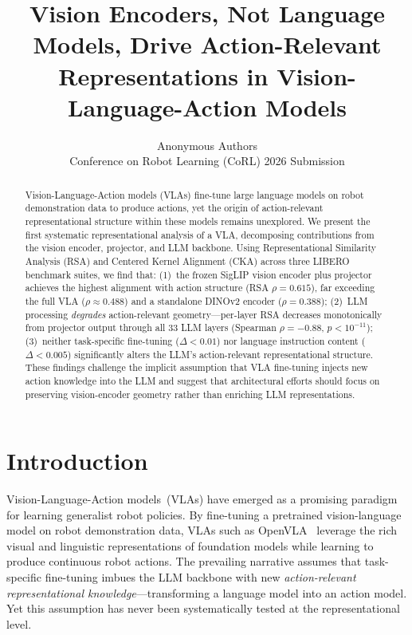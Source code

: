 \documentclass[10pt,letterpaper]{article}
\title{Vision Encoders, Not Language Models, Drive Action-Relevant\\Representations in Vision-Language-Action Models}
\author{
  Anonymous Authors\\
  Conference on Robot Learning (CoRL) 2026 Submission
}
\date{}
\begin{document}
\maketitle

\begin{abstract}
Vision-Language-Action models (VLAs) fine-tune large language models on robot demonstration data to produce actions, yet the origin of action-relevant representational structure within these models remains unexplored.
We present the first systematic representational analysis of a VLA, decomposing contributions from the vision encoder, projector, and LLM backbone.
Using Representational Similarity Analysis (RSA) and Centered Kernel Alignment (CKA) across three LIBERO benchmark suites, we find that:
(1)~the frozen SigLIP vision encoder plus projector achieves the highest alignment with action structure (RSA $\rho{=}0.615$), far exceeding the full VLA ($\rho{\approx}0.488$) and a standalone DINOv2 encoder ($\rho{=}0.388$);
(2)~LLM processing \emph{degrades} action-relevant geometry---per-layer RSA decreases monotonically from projector output through all 33 LLM layers (Spearman $\rho{=}{-}0.88$, $p{<}10^{-11}$);
(3)~neither task-specific fine-tuning ($\Delta{<}0.01$) nor language instruction content ($\Delta{<}0.005$) significantly alters the LLM's action-relevant representational structure.
These findings challenge the implicit assumption that VLA fine-tuning injects new action knowledge into the LLM and suggest that architectural efforts should focus on preserving vision-encoder geometry rather than enriching LLM representations.
\end{abstract}

\section{Introduction}
\label{sec:intro}

Vision-Language-Action models~(VLAs) have emerged as a promising paradigm for learning generalist robot policies.
By fine-tuning a pretrained vision-language model on robot demonstration data, VLAs such as OpenVLA~\citep{kim2024openvla} leverage the rich visual and linguistic representations of foundation models while learning to produce continuous robot actions.
The prevailing narrative assumes that task-specific fine-tuning imbues the LLM backbone with new \emph{action-relevant representational knowledge}---transforming a language model into an action model.
Yet this assumption has never been systematically tested at the representational level.
\end{document}
